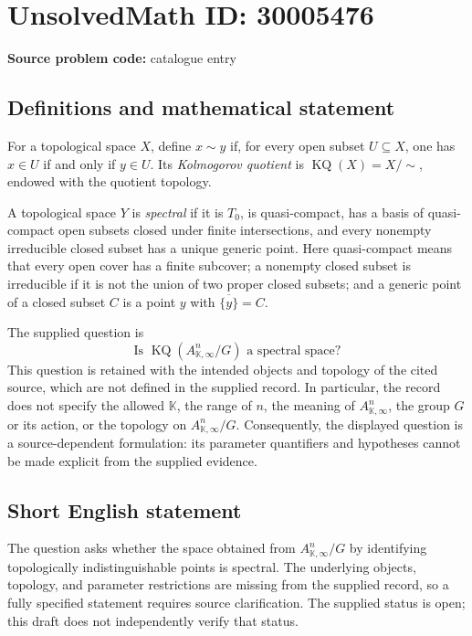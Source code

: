 \documentclass[11pt]{article}
\begin{document}
\section*{UnsolvedMath ID: 30005476}
\textbf{Source problem code:} catalogue entry
\subsection{Definitions and mathematical statement}
For a topological space \(X\), define \(x\sim y\) if, for every open subset \(U\subseteq X\), one has \(x\in U\) if and only if \(y\in U\). Its \emph{Kolmogorov quotient} is \(\operatorname{KQ}(X)=X/{\sim}\), endowed with the quotient topology.

A topological space \(Y\) is \emph{spectral} if it is \(T_0\), is quasi-compact, has a basis of quasi-compact open subsets closed under finite intersections, and every nonempty irreducible closed subset has a unique generic point. Here quasi-compact means that every open cover has a finite subcover; a nonempty closed subset is irreducible if it is not the union of two proper closed subsets; and a generic point of a closed subset \(C\) is a point \(y\) with \(\overline{\{y\}}=C\).

The supplied question is
\[
\text{Is }\operatorname{KQ}\!\left(A_{\mathbb K,\infty}^{n}/G\right)\text{ a spectral space?}
\]
This question is retained with the intended objects and topology of the cited source, which are not defined in the supplied record. In particular, the record does not specify the allowed \(\mathbb K\), the range of \(n\), the meaning of \(A_{\mathbb K,\infty}^{n}\), the group \(G\) or its action, or the topology on \(A_{\mathbb K,\infty}^{n}/G\). Consequently, the displayed question is a source-dependent formulation: its parameter quantifiers and hypotheses cannot be made explicit from the supplied evidence.
\subsection{Short English statement}
The question asks whether the space obtained from \(A_{\mathbb K,\infty}^{n}/G\) by identifying topologically indistinguishable points is spectral. The underlying objects, topology, and parameter restrictions are missing from the supplied record, so a fully specified statement requires source clarification. The supplied status is open; this draft does not independently verify that status.
\end{document}
